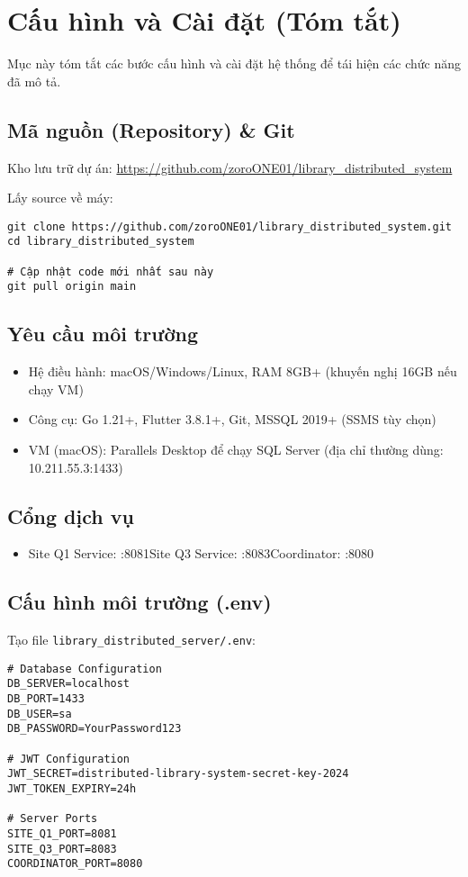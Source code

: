 \documentclass[conference]{IEEEtran}
\begin{document}
\section{Cấu hình và Cài đặt (Tóm tắt)}
Mục này tóm tắt các bước cấu hình và cài đặt hệ thống để tái hiện các chức năng đã mô tả.

\subsection{Mã nguồn (Repository) \& Git}
Kho lưu trữ dự án: \url{https://github.com/zoroONE01/library_distributed_system}

Lấy source về máy:
\begin{Verbatim}[fontsize=\footnotesize,breaklines=true,breakanywhere=true]
git clone https://github.com/zoroONE01/library_distributed_system.git
cd library_distributed_system

# Cập nhật code mới nhất sau này
git pull origin main
\end{Verbatim}

\subsection{Yêu cầu môi trường}
\begin{itemize}
    \item Hệ điều hành: macOS/Windows/Linux, RAM 8GB+ (khuyến nghị 16GB nếu chạy VM)
    \item Công cụ: Go 1.21+, Flutter 3.8.1+, Git, MSSQL 2019+ (SSMS tùy chọn)
    \item VM (macOS): Parallels Desktop để chạy SQL Server (địa chỉ thường dùng: 10.211.55.3:1433)
\end{itemize}

\subsection{Cổng dịch vụ}
\begin{itemize}
    \item Site Q1 Service: :8081\quad Site Q3 Service: :8083\quad Coordinator: :8080
\end{itemize}

\subsection{Cấu hình môi trường (.env)}
Tạo file \texttt{library\_distributed\_server/.env}:

\begin{Verbatim}[fontsize=\footnotesize,breaklines=true,breakanywhere=true]
# Database Configuration
DB_SERVER=localhost
DB_PORT=1433
DB_USER=sa
DB_PASSWORD=YourPassword123

# JWT Configuration
JWT_SECRET=distributed-library-system-secret-key-2024
JWT_TOKEN_EXPIRY=24h

# Server Ports
SITE_Q1_PORT=8081
SITE_Q3_PORT=8083
COORDINATOR_PORT=8080
\end{Verbatim}
\end{document}
